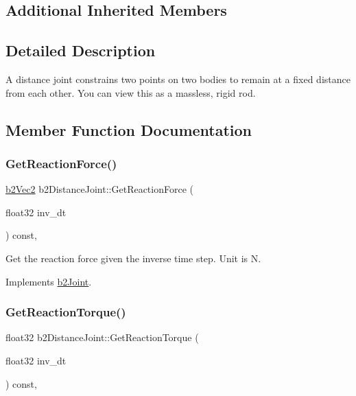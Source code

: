 \subsection*{Additional Inherited Members}


\subsection{Detailed Description}
A distance joint constrains two points on two bodies to remain at a fixed distance from each other. You can view this as a massless, rigid rod. 

\subsection{Member Function Documentation}
\mbox{\label{classb2_distance_joint_a6aa951e5bbfcae8a617987955cadbed5}} 
\subsubsection{\texorpdfstring{Get\+Reaction\+Force()}{GetReactionForce()}}
{\footnotesize\ttfamily \hyperlink{structb2_vec2}{b2\+Vec2} b2\+Distance\+Joint\+::\+Get\+Reaction\+Force (\begin{DoxyParamCaption}\item[{float32}]{inv\+\_\+dt }\end{DoxyParamCaption}) const\hspace{0.3cm}{\ttfamily [override]}, {\ttfamily [virtual]}}

Get the reaction force given the inverse time step. Unit is N. 

Implements \hyperlink{classb2_joint_a7e0eddefb9b69ad050b8ef6425838a74}{b2\+Joint}.

\mbox{\label{classb2_distance_joint_ad7ac78c4c20c122b944947d523a02982}} 
\subsubsection{\texorpdfstring{Get\+Reaction\+Torque()}{GetReactionTorque()}}
{\footnotesize\ttfamily float32 b2\+Distance\+Joint\+::\+Get\+Reaction\+Torque (\begin{DoxyParamCaption}\item[{float32}]{inv\+\_\+dt }\end{DoxyParamCaption}) const\hspace{0.3cm}{\ttfamily [override]}, {\ttfamily [virtual]}}

